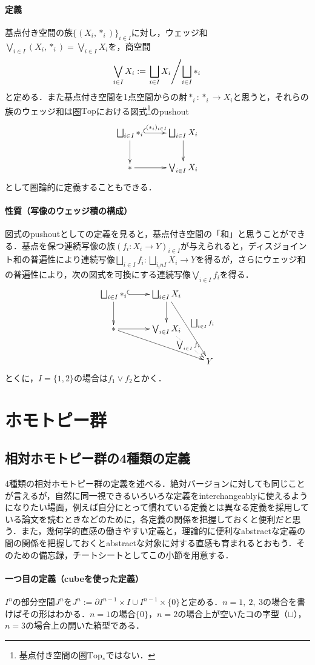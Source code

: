 \documentclass[a4paper,11pt]{jsarticle}
\theoremstyle{definition}
\begin{document}
\paragraph{定義}
基点付き空間の族$\{(X_i,*_i)\}_{i\in I}$に対し，ウェッジ和$\bigvee_{i\in I}(X_i,*_i)=\bigvee_{i\in I}X_i$を，商空間\[
  \bigvee_{i\in I}X_i:=\left.{\bigsqcup_{i\in I}X_i}\middle/{\bigsqcup_{i\in I}*_i}\right.
\]
と定める．また基点付き空間を1点空間からの射$*_i\colon *_i\to X_i$と思うと，それらの族のウェッジ和は圏$\mathrm{Top}$における図式\footnote{基点付き空間の圏$\mathrm{Top}_*$ではない．}のpushout
\[
  \xymatrix{
  \bigsqcup_{i\in I}*_i \ar@{^{(}->}[r]^{(*_i)_{i\in I}} \ar[d] & \bigsqcup_{i\in I}X_i \ar[d]\\
  \ast \ar[r]&\bigvee_{i\in I}X_i
  }
\]
として圏論的に定義することもできる．
\paragraph{性質（写像のウェッジ積の構成）}図式のpushoutとしての定義を見ると，基点付き空間の「和」と思うことができる．基点を保つ連続写像の族$(f_i\colon X_i\to Y)_{i\in I}$が与えられると，ディスジョイント和の普遍性により連続写像$\bigsqcup_{i\in I}f_i\colon \bigsqcup_{i_in I}X_i\to Y$を得るが，さらにウェッジ和の普遍性により，次の図式を可換にする連続写像$\bigvee_{i\in I}f_i$を得る．
\[
\xymatrix{
  \bigsqcup_{i\in I}*_i \ar@{^{(}->}[r] \ar[d] & \bigsqcup_{i\in I}X_i \ar[d]\ar[rdd]^{\bigsqcup_{i\in I}f_i}&\\
  \ast \ar[r]\ar[rrd]&\bigvee_{i\in I}X_i\ar@{.>}[rd]|{\bigvee_{i\in I}f_i}&\\
   & &Y
}
\]
とくに，$I=\{1,2\}$の場合は$f_1\vee f_2$とかく．
\section{ホモトピー群}
\subsection{相対ホモトピー群の4種類の定義}
4種類の相対ホモトピー群の定義を述べる．絶対バージョンに対しても同じことが言えるが，自然に同一視できるいろいろな定義をinterchangeablyに使えるようになりたい場面，例えば自分にとって慣れている定義とは異なる定義を採用している論文を読むときなどのために，各定義の関係を把握しておくと便利だと思う．また，幾何学的直感の働きやすい定義と，理論的に便利なabstractな定義の間の関係を把握しておくとabstractな対象に対する直感も育まれるとおもう．そのための備忘録，チートシートとしてこの小節を用意する．
\paragraph{一つ目の定義（cubeを使った定義）}
$I^n$の部分空間$J^n$を$J^n:=\partial I^{n-1}\times I\cup I^{n-1}\times\{0\}$と定める．$n=1,\ 2,\ 3$の場合を書けばその形はわかる．$n=1$の場合$\{0\}$，$n=2$の場合上が空いたコの字型（$\sqcup$），$n=3$の場合上の開いた箱型である．
\end{document}

